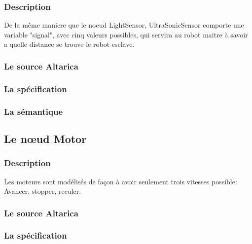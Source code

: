    \subsubsection{Description}
   De la même maniere que le noeud LightSensor, UltraSonicSensor
   comporte une variable "signal", avec cinq valeurs possibles, qui
   servira au robot maitre à savoir a quelle distance se trouve le robot
   esclave.

   \subsubsection{Le source Altarica}
   
   
   \subsubsection{La spécification}
   
   
   \subsubsection{La sémantique}

  \subsection{Le n\oe{}ud Motor}
  
   \subsubsection{Description}
   Les moteurs sont modélisés de façon à avoir seulement trois vitesses
   possible: Avancer, stopper, reculer.

   \subsubsection{Le source Altarica}
   
   
   \subsubsection{La spécification}
   
   
